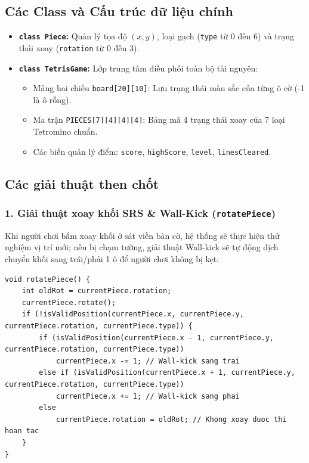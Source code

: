 \documentclass[12pt,a4paper]{article}
\begin{document}
\subsection{Các Class và Cấu trúc dữ liệu chính}
\begin{itemize}
    \item \textbf{\texttt{class Piece}:} Quản lý tọa độ $(x, y)$, loại gạch (\texttt{type} từ 0 đến 6) và trạng thái xoay (\texttt{rotation} từ 0 đến 3).
    \item \textbf{\texttt{class TetrisGame}:} Lớp trung tâm điều phối toàn bộ tài nguyên:
    \begin{itemize}
        \item Mảng hai chiều \texttt{board[20][10]}: Lưu trạng thái màu sắc của từng ô cờ (-1 là ô rỗng).
        \item Ma trận \texttt{PIECES[7][4][4][4]}: Bảng mã 4 trạng thái xoay của 7 loại Tetromino chuẩn.
        \item Các biến quản lý điểm: \texttt{score}, \texttt{highScore}, \texttt{level}, \texttt{linesCleared}.
    \end{itemize}
\end{itemize}

\subsection{Các giải thuật then chốt}
\subsubsection{1. Giải thuật xoay khối SRS \& Wall-Kick (\texttt{rotatePiece})}
Khi người chơi bấm xoay khối ở sát viền bàn cờ, hệ thống sẽ thực hiện thử nghiệm vị trí mới; nếu bị chạm tường, giải thuật Wall-kick sẽ tự động dịch chuyển khối sang trái/phải 1 ô để người chơi không bị kẹt:
\begin{lstlisting}
void rotatePiece() {
    int oldRot = currentPiece.rotation;
    currentPiece.rotate();
    if (!isValidPosition(currentPiece.x, currentPiece.y, currentPiece.rotation, currentPiece.type)) {
        if (isValidPosition(currentPiece.x - 1, currentPiece.y, currentPiece.rotation, currentPiece.type))
            currentPiece.x -= 1; // Wall-kick sang trai
        else if (isValidPosition(currentPiece.x + 1, currentPiece.y, currentPiece.rotation, currentPiece.type))
            currentPiece.x += 1; // Wall-kick sang phai
        else
            currentPiece.rotation = oldRot; // Khong xoay duoc thi hoan tac
    }
}
\end{lstlisting}
\end{document}
